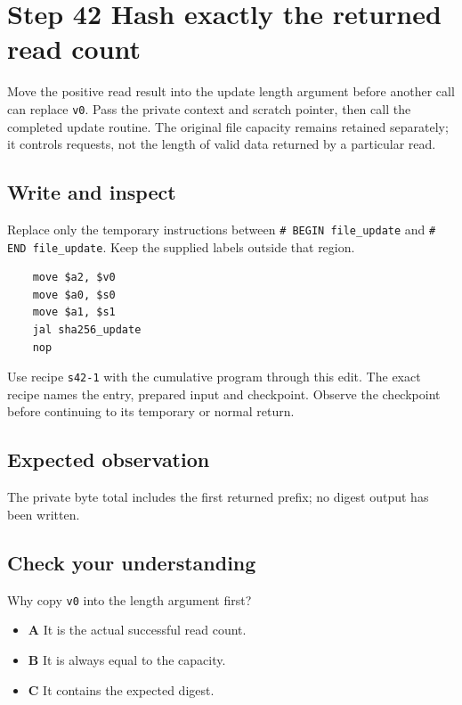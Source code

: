 \section{Step 42 Hash exactly the returned read count}\label{sha-s42}

Move the positive read result into the update length argument before another call can replace \texttt{v0}. Pass the private context and scratch pointer, then call the completed update routine. The original file capacity remains retained separately; it controls requests, not the length of valid data returned by a particular read.

\subsection{Write and inspect}
Replace only the temporary instructions between \texttt{\# BEGIN file\_update} and \texttt{\# END file\_update}. Keep the supplied labels outside that region.

\begin{verbatim}
    move $a2, $v0
    move $a0, $s0
    move $a1, $s1
    jal sha256_update
    nop
\end{verbatim}

Use recipe \texttt{s42-1} with the cumulative program through this edit. The exact recipe names the entry, prepared input and checkpoint. Observe the checkpoint before continuing to its temporary or normal return.

\subsection{Expected observation}
The private byte total includes the first returned prefix; no digest output has been written.

\subsection{Check your understanding}
Why copy \texttt{v0} into the length argument first?

\begin{itemize}
  \item \textbf{A} It is the actual successful read count.
  \item \textbf{B} It is always equal to the capacity.
  \item \textbf{C} It contains the expected digest.
\end{itemize}
